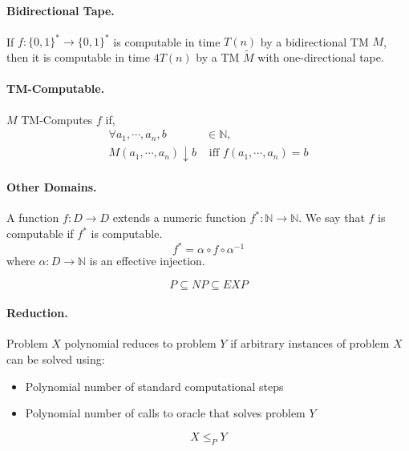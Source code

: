 \documentclass[a4paper]{article}
\begin{document}
\begin{multicols}{2}
\begin{tcolorbox}[title=Turing Machine]
    \paragraph{Bidirectional Tape.} If $f:\{0,1\}^*\rightarrow \{0,1\}^*$ is computable in time $T(n)$ by a bidirectional TM $M$, then it is computable in time $4T(n)$ by a TM $\tilde{M}$ with one-directional tape.

    \paragraph{TM-Computable.} $M$ TM-Computes $f$ if, 
    \begin{align*}\forall a_1,\cdots,a_n,b&\in \mathbb{N},\\M(a_1,\cdots,a_n)\downarrow b &\text{ iff }f(a_1,\cdots,a_n)=b\end{align*}

    \paragraph{Other Domains.} A function $f:D\rightarrow D$ extends a numeric function $f^*:\mathbb{N}\rightarrow \mathbb{N}$. We say that $f$ is computable if $f^*$ is computable.
    \begin{equation*}
        f^* = \alpha \circ f \circ \alpha^{-1}
    \end{equation*}
    where $\alpha: D\rightarrow \mathbb{N}$ is an effective injection.
\end{tcolorbox}

\begin{tcolorbox}[title=NP Reduction]
    \begin{equation*}
        P\subseteq NP\subseteq EXP
    \end{equation*}

    \paragraph{Reduction.} Problem $X$ polynomial reduces to problem $Y$ if arbitrary instances of problem $X$ can be solved using:
    \begin{itemize}
        \item Polynomial number of standard computational steps
        \item Polynomial number of calls to oracle that solves problem $Y$
    \end{itemize}
    \begin{equation*}
        X \leq_P Y
    \end{equation*}


\end{tcolorbox}
\end{multicols}
\end{document}

